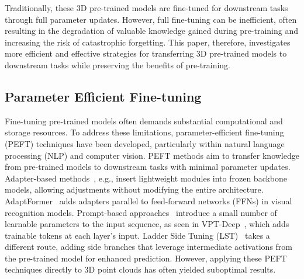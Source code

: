 
Traditionally, these 3D pre-trained models are fine-tuned for downstream tasks through full parameter updates. However, full fine-tuning can be inefficient, often resulting in the degradation of valuable knowledge gained during pre-training and increasing the risk of catastrophic forgetting. This paper, therefore, investigates more efficient and effective strategies for transferring 3D pre-trained models to downstream tasks while preserving the benefits of pre-training.

\subsection{Parameter Efficient Fine-tuning}
Fine-tuning pre-trained models often demands substantial computational and storage resources. To address these limitations, parameter-efficient fine-tuning (PEFT) techniques have been developed, particularly within natural language processing (NLP) and computer vision. PEFT methods aim to transfer knowledge from pre-trained models to downstream tasks with minimal parameter updates. 
Adapter-based methods~\cite{houlsby2019parameter, hu2021lora, chen2022adaptformer}, e.g., insert lightweight modules into frozen backbone models, allowing adjustments without modifying the entire architecture. AdaptFormer~\cite{chen2022adaptformer} adds adapters parallel to feed-forward networks (FFNs) in visual recognition models. 
Prompt-based approaches~\cite{li2021prefix, jia2022visual} introduce a small number of learnable parameters to the input sequence, as seen in VPT-Deep~\cite{jia2022visual}, which adds trainable tokens at each layer’s input. 
Ladder Side Tuning (LST)~\cite{sung2022lst} takes a different route, adding side branches that leverage intermediate activations from the pre-trained model for enhanced prediction. However, applying these PEFT techniques directly to 3D point clouds has often yielded suboptimal results.


